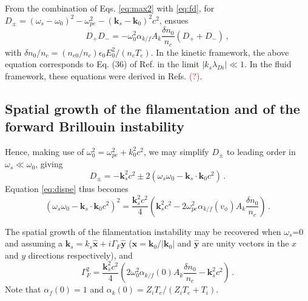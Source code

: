 \documentclass[
 reprint,
 amsmath,amssymb,
 aps,
]{revtex4-1}
\begin{document}
From the combination of  Eqs. \eqref{eq:max2} with \eqref{eq:fd}, 
for $D_\pm= (\omega_s-\omega_0)^2 - \omega_{pe}^2 -( \mathbf{k}_s-\mathbf{k}_0) ^2c^2 $, ensues
\begin{equation}\label{eq:dispe}
    D_+D_- = -\omega_{0}^2\alpha_{k/f}A_k\frac{\delta n_0}{n_c} (D_++D_-) \, ,
\end{equation}
with $\delta n_0/n_c = (n_{e0}/n_c) \epsilon_0E_0^2/(n_c T_e)$.
In the kinetic framework, the above equation corresponds to Eq. (36) of Ref. \cite[]{POF_Cohen_79} in the limit $\vert k_s \lambda_{Di} \vert \ll 1$. In the fluid framework, these equations were derived in Refs. \cite[]{Kruer,phd_Michel,phd-Grech} \textcolor{red}{(?)}.

\subsection{Spatial growth of the filamentation and of the forward Brillouin instability}
Hence,  making use of $\omega_0^2=\omega_{pe}^2 +k_0^2c^2$, we may simplify $D_\pm$ to leading order in $\omega_s\ll\omega_0$, giving 
\begin{equation}\label{eq:dpm}
D_\pm = -\mathbf{k}_s^2c^2\pm 2(\omega_s\omega_0 - \mathbf{k}_s\cdot\mathbf{k}_0 c^2) \, .
\end{equation} 
Equation \eqref{eq:dispe} thus becomes 
\begin{equation}\label{eq:dispe2} 
(\omega_s\omega_0 - \mathbf{k}_s\cdot\mathbf{k}_0 c^2)^2
=\frac{\mathbf{k}_s^2c^2}{4}\left( \mathbf{k}_s^2c^2 - 2\omega_{pe}^2\alpha_{k/f}(v_\phi)A_k\frac{\delta n_0}{n_c} \right) 
\, .
\end{equation}

The spatial growth of the filamentation instability may be recovered when $\omega_s$=0 and assuming a $\mathbf{k}_s = k_s \hat{\mathbf{x}} +i\Gamma_F \hat{\mathbf{y}}$ ($\hat{\mathbf{x}}=\mathbf{k}_0 /\vert \mathbf{k}_0 \vert $ and  $\hat{\mathbf{y}}$  are unity vectors in the $x$ and $y$ directions respectively), and 
\begin{equation}\label{eq:gf} 
\Gamma_F^2
=\frac{\mathbf{k}_s^2c^2}{4}\left( 2\omega_{0}^2\alpha_{k/f}(0)A_k\frac{\delta n_0}{n_c}- \mathbf{k}_s^2c^2 \right) 
\, .
\end{equation}
Note that $\alpha_f(0)=1$ and $\alpha_k(0)=Z_iT_e/(Z_iT_e+T_i)$.
\end{document}
